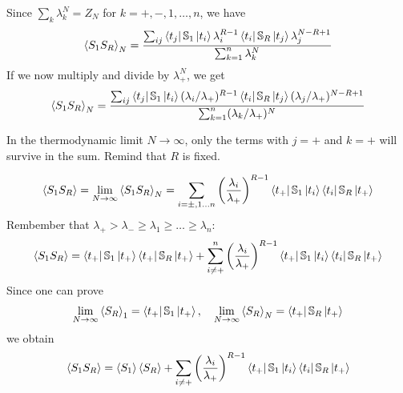 \documentclass[../main/main.tex]{subfiles}
\begin{document}
\noindent Since \( \sum_{k}^{} \lambda _k^N = Z_N \) for \( k=+,-,1,\dots,n \), we have
\begin{equation*}
  \expval{S_1 S_R}_N = \frac{\sum_{ij}^{} \bra{t_j} \mathbb{S}_1 \ket{t_i} \lambda _i^{R-1} \bra{t_i} \mathbb{S}_R \ket{t_j} \lambda _j^{N-R+1}      }{\sum_{k=1}^{n} \lambda _k^N  }
\end{equation*}
If we now multiply and divide by \( \lambda _+^N \), we get
\begin{equation*}
  \expval{S_1 S_R}_N = \frac{\sum_{ij}^{} \bra{t_j} \mathbb{S}_1 \ket{t_i} (\lambda _i/ \lambda _+)^{R-1}  \bra{t_i} \mathbb{S}_R \ket{t_j} (\lambda _j / \lambda _+)^{N-R+1}    }{\sum_{k=1}^{n} (\lambda _k  / \lambda _+)^{N} }
\end{equation*}
\begin{remark}
In the thermodynamic limit \( N \rightarrow \infty  \), only the terms with \( j=+ \) and \( k=+ \) will survive in the sum. Remind that \( R \) is fixed.
\end{remark}
\begin{equation*}
\expval{S_1 S_R} =   \lim_{N \rightarrow \infty } \expval{S_1 S_R}_N = \sum_{i= \pm,1 \dots n}^{} \qty(\frac{\lambda _i}{\lambda _+})^{R-1} \bra{t_+} \mathbb{S}_1 \ket{t_i} \bra{t_i} \mathbb{S}_R \ket{t_+}
\end{equation*}
Rembember that \( \lambda _+ > \lambda _- \ge \lambda _1 \ge \dots \ge \lambda _n \):
\begin{equation*}
  \expval{S_1 S_R} = \bra{t_+} \mathbb{S}_1 \ket{t_+} \bra{t_+} \mathbb{S}_R \ket{t_+} +   \sum_{i \neq +}^{n} \qty(\frac{\lambda _i}{\lambda _+})^{R-1} \bra{t_+} \mathbb{S}_1 \ket{t_i} \bra{t_i} \mathbb{S}_R \ket{t_+}
\end{equation*}
Since one can prove 
\begin{equation}
  \lim_{N \rightarrow \infty } \expval{S_R}_1 = \bra{t_+} \mathbb{S}_1 \ket{t_+} , \quad \lim_{N \rightarrow \infty } \expval{S_R}_N = \bra{t_+} \mathbb{S}_R \ket{t_+}
  \label{eq:8_3}
\end{equation}
we obtain
\begin{equation}
  \expval{S_1 S_R} = \expval{S_1} \expval{S_R} + \sum_{i \neq +}^{}  \qty(\frac{\lambda _i}{\lambda _+})^{R-1} \bra{t_+} \mathbb{S}_1 \ket{t_i} \bra{t_i} \mathbb{S}_R \ket{t_+}
  \label{eq:8_2}
\end{equation}
\end{document}
